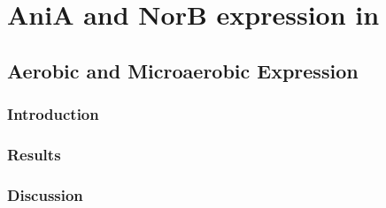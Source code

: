 \chapter{AniA and NorB expression in \Nm}
\section{Aerobic and Microaerobic Expression}
\subsection{Introduction}
\subsection{Results}
\subsection{Discussion}